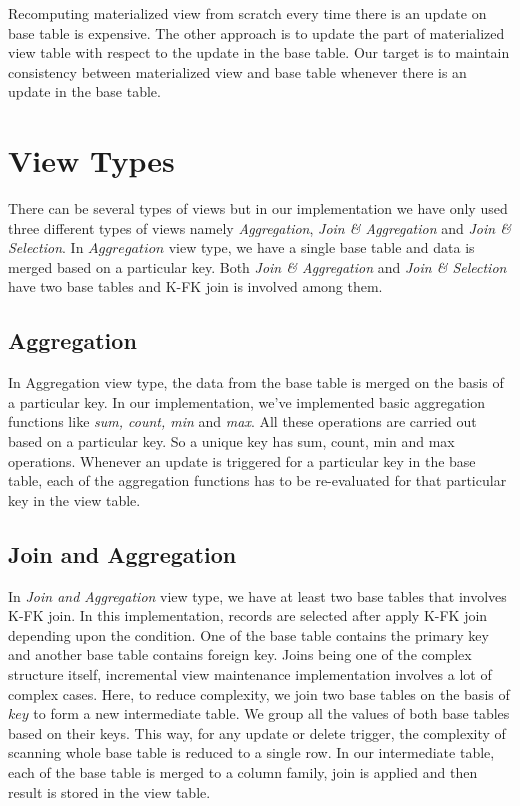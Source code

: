 \documentclass[11pt,a4paper,bibtotoc,idxtotoc,headsepline,footsepline,footexclude,BCOR12mm,DIV13]{scrbook}
\begin{document}
Recomputing materialized view from scratch every time there is an update on base table is expensive. The other approach is to update the part of materialized view table with respect to the update in the base table. Our target is to maintain consistency between materialized view and base table whenever there is an update in the base table.

\section{View Types}
\label{View Types}
There can be several types of views but in our implementation we have only used three different types of views namely \emph{Aggregation}, \emph{Join \& Aggregation} and \emph{Join \& Selection}. In $Aggregation$ view type, we have a single base table and data is merged based on a particular key. Both  \emph{Join \& Aggregation} and \emph{Join \& Selection} have two base tables and K-FK join is involved among them. 

\subsection{Aggregation}
In Aggregation view type, the data from the base table is merged on the basis of a particular key. In our implementation, we've implemented basic aggregation functions like \emph{sum, count, min} and \emph{max}. All these operations are carried out based on a particular key. So a unique key has sum, count, min and max operations. Whenever an update is triggered for a particular key in the base table, each of the aggregation functions has to be re-evaluated for that particular key in the view table.


\subsection{Join and Aggregation}
In \emph{Join and Aggregation} view type, we have at least two base tables that involves K-FK join. In this implementation, records are selected after apply K-FK join depending upon the condition. One of the base table contains the primary key and another base table contains foreign key. Joins being one of the complex structure itself, incremental view maintenance implementation involves a lot of complex cases. Here, to reduce complexity, we join two base tables on the basis of $key$ to form a new intermediate table. We group all the values of both base tables based on their keys. This way, for any update or delete trigger, the complexity of scanning whole base table is reduced to a single row. In our intermediate table, each of the base table is merged to a column family, join is applied and then result is stored in the view table. 
\end{document}
